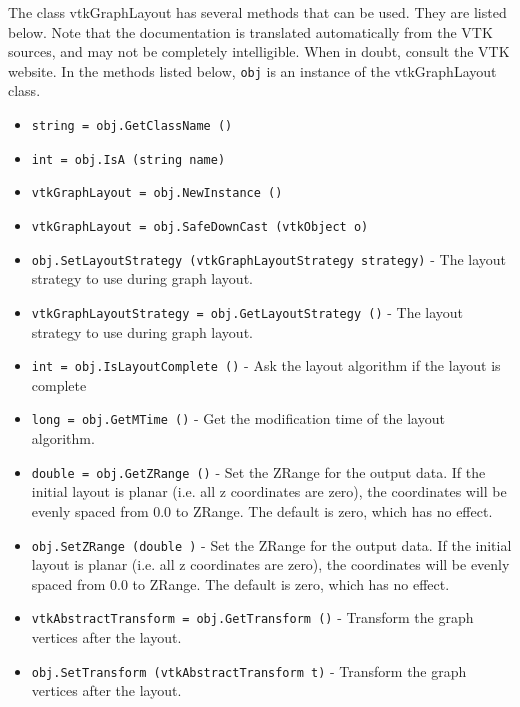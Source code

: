 The class vtkGraphLayout has several methods that can be used.
  They are listed below.
Note that the documentation is translated automatically from the VTK sources,
and may not be completely intelligible.  When in doubt, consult the VTK website.
In the methods listed below, \verb|obj| is an instance of the vtkGraphLayout class.
\begin{itemize}
\item  \verb|string = obj.GetClassName ()|

\item  \verb|int = obj.IsA (string name)|

\item  \verb|vtkGraphLayout = obj.NewInstance ()|

\item  \verb|vtkGraphLayout = obj.SafeDownCast (vtkObject o)|

\item  \verb|obj.SetLayoutStrategy (vtkGraphLayoutStrategy strategy)| -  The layout strategy to use during graph layout.

\item  \verb|vtkGraphLayoutStrategy = obj.GetLayoutStrategy ()| -  The layout strategy to use during graph layout.

\item  \verb|int = obj.IsLayoutComplete ()| -  Ask the layout algorithm if the layout is complete

\item  \verb|long = obj.GetMTime ()| -  Get the modification time of the layout algorithm.

\item  \verb|double = obj.GetZRange ()| -  Set the ZRange for the output data.
 If the initial layout is planar (i.e. all z coordinates are zero),
 the coordinates will be evenly spaced from 0.0 to ZRange.
 The default is zero, which has no effect.

\item  \verb|obj.SetZRange (double )| -  Set the ZRange for the output data.
 If the initial layout is planar (i.e. all z coordinates are zero),
 the coordinates will be evenly spaced from 0.0 to ZRange.
 The default is zero, which has no effect.

\item  \verb|vtkAbstractTransform = obj.GetTransform ()| -  Transform the graph vertices after the layout.

\item  \verb|obj.SetTransform (vtkAbstractTransform t)| -  Transform the graph vertices after the layout.


\end{itemize}
